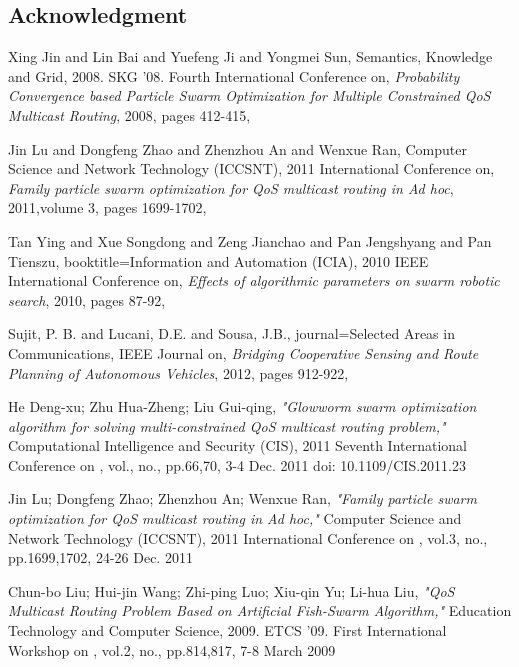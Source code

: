 \documentclass[journal]{IEEEtran}
\begin{document}
\begin{itemize}
\section{Acknowledgment}

\ifCLASSOPTIONcaptionsoff
  \newpage
\fi
\begin{thebibliography}{1}

Xing Jin and Lin Bai and Yuefeng Ji and Yongmei Sun,
Semantics, Knowledge and Grid, 2008. SKG '08. Fourth International Conference on, \emph{Probability Convergence based Particle Swarm Optimization for Multiple Constrained QoS Multicast Routing},
2008, pages 412-415,

Jin Lu and Dongfeng Zhao and Zhenzhou An and Wenxue Ran,
Computer Science and Network Technology (ICCSNT), 2011 International Conference on, \emph{Family particle swarm optimization for QoS multicast routing in Ad hoc},
2011,volume 3, pages 1699-1702,

Tan Ying and Xue Songdong and Zeng Jianchao and Pan Jengshyang and Pan Tienszu,
booktitle={Information and Automation (ICIA), 2010 IEEE International Conference on}, \emph{Effects of algorithmic parameters on swarm robotic search},
2010, pages 87-92,

Sujit, P. B. and Lucani, D.E. and Sousa, J.B.,
journal={Selected Areas in Communications, IEEE Journal on}, \emph{Bridging Cooperative Sensing and Route Planning of Autonomous Vehicles},
2012, pages 912-922,

He Deng-xu; Zhu Hua-Zheng; Liu Gui-qing, \emph{"Glowworm swarm optimization algorithm for solving multi-constrained QoS multicast routing problem,"} Computational Intelligence and Security (CIS), 2011 Seventh International Conference on , vol., no., pp.66,70, 3-4 Dec. 2011
doi: 10.1109/CIS.2011.23

Jin Lu; Dongfeng Zhao; Zhenzhou An; Wenxue Ran, \emph{"Family particle swarm optimization for QoS multicast routing in Ad hoc,"} Computer Science and Network Technology (ICCSNT), 2011 International Conference on , vol.3, no., pp.1699,1702, 24-26 Dec. 2011

Chun-bo Liu; Hui-jin Wang; Zhi-ping Luo; Xiu-qin Yu; Li-hua Liu, \emph{"QoS Multicast Routing Problem Based on Artificial Fish-Swarm Algorithm,"} Education Technology and Computer Science, 2009. ETCS '09. First International Workshop on , vol.2, no., pp.814,817, 7-8 March 2009


\end{thebibliography}
\end{itemize}
\end{document}
